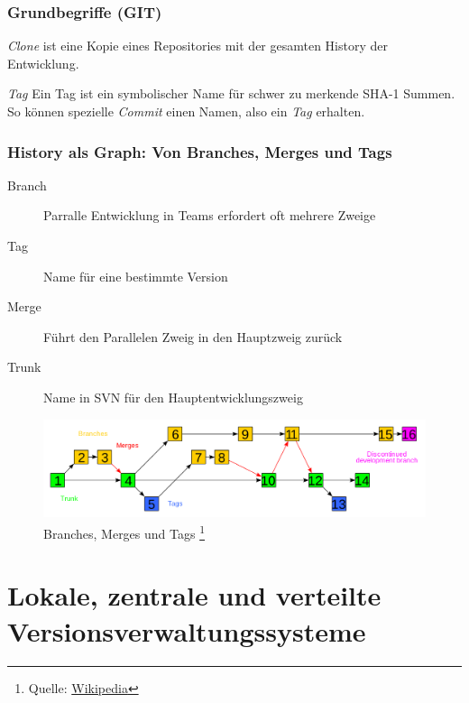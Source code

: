 \documentclass{beamer}
\begin{document}
\begin{frame}\frametitle{Grundbegriffe (GIT)}
\begin{block}{\textit{Clone}}
ist eine Kopie eines Repositories mit der gesamten History der Entwicklung.
\end{block}
\begin{block}{\textit{Tag}}
Ein Tag ist ein symbolischer Name für schwer zu merkende SHA-1 Summen. So können spezielle \textit{Commit} einen Namen, also ein \textit{Tag} erhalten. 
\end{block}
\end{frame}

\begin{frame}\frametitle{History als Graph: Von Branches, Merges und Tags}
\begin{description}
\item[Branch] Parralle Entwicklung in Teams erfordert oft mehrere Zweige
\item[Tag] Name für eine bestimmte Version 
\item[Merge] Führt den Parallelen Zweig in den Hauptzweig zurück
\item[Trunk] Name in SVN für den Hauptentwicklungszweig
\end{description}

\begin{figure}
\includegraphics[scale=0.15]{2000px-Subversion_project_visualization} 
\caption{Branches, Merges und Tags \footnote{Quelle: \href{http://en.wikipedia.org/wiki/File:Subversion_project_visualization.svg}{Wikipedia}}}
\end{figure}
\end{frame}

\section{Lokale, zentrale und verteilte Versionsverwaltungssysteme} 
\end{document}
